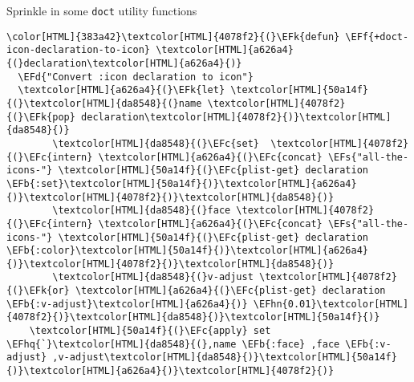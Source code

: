 \documentclass{scrartcl}
\newcommand{\EFk}[1]{\textcolor{EFk}{#1}} %
\newcommand{\EFd}[1]{\textcolor{EFd}{\textit{#1}}} %
\newcommand{\EFs}[1]{\textcolor{EFs}{#1}} %
\newcommand{\EFb}[1]{\textcolor{EFb}{#1}} %
\newcommand{\EFc}[1]{\textcolor{EFc}{#1}} %
\newcommand{\EFf}[1]{\textcolor{EFf}{#1}} %
\newcommand{\EFhn}[1]{\textcolor{EFhn}{\textbf{#1}}} %
\newcommand{\EFhq}[1]{\textcolor{EFhq}{#1}} %
\begin{document}
Sprinkle in some \texttt{doct} utility functions
\begin{Code}
\begin{Verbatim}[]
\color[HTML]{383a42}\textcolor[HTML]{4078f2}{(}\EFk{defun} \EFf{+doct-icon-declaration-to-icon} \textcolor[HTML]{a626a4}{(}declaration\textcolor[HTML]{a626a4}{)}
  \EFd{"Convert :icon declaration to icon"}
  \textcolor[HTML]{a626a4}{(}\EFk{let} \textcolor[HTML]{50a14f}{(}\textcolor[HTML]{da8548}{(}name \textcolor[HTML]{4078f2}{(}\EFk{pop} declaration\textcolor[HTML]{4078f2}{)}\textcolor[HTML]{da8548}{)}
        \textcolor[HTML]{da8548}{(}\EFc{set}  \textcolor[HTML]{4078f2}{(}\EFc{intern} \textcolor[HTML]{a626a4}{(}\EFc{concat} \EFs{"all-the-icons-"} \textcolor[HTML]{50a14f}{(}\EFc{plist-get} declaration \EFb{:set}\textcolor[HTML]{50a14f}{)}\textcolor[HTML]{a626a4}{)}\textcolor[HTML]{4078f2}{)}\textcolor[HTML]{da8548}{)}
        \textcolor[HTML]{da8548}{(}face \textcolor[HTML]{4078f2}{(}\EFc{intern} \textcolor[HTML]{a626a4}{(}\EFc{concat} \EFs{"all-the-icons-"} \textcolor[HTML]{50a14f}{(}\EFc{plist-get} declaration \EFb{:color}\textcolor[HTML]{50a14f}{)}\textcolor[HTML]{a626a4}{)}\textcolor[HTML]{4078f2}{)}\textcolor[HTML]{da8548}{)}
        \textcolor[HTML]{da8548}{(}v-adjust \textcolor[HTML]{4078f2}{(}\EFk{or} \textcolor[HTML]{a626a4}{(}\EFc{plist-get} declaration \EFb{:v-adjust}\textcolor[HTML]{a626a4}{)} \EFhn{0.01}\textcolor[HTML]{4078f2}{)}\textcolor[HTML]{da8548}{)}\textcolor[HTML]{50a14f}{)}
    \textcolor[HTML]{50a14f}{(}\EFc{apply} set \EFhq{`}\textcolor[HTML]{da8548}{(},name \EFb{:face} ,face \EFb{:v-adjust} ,v-adjust\textcolor[HTML]{da8548}{)}\textcolor[HTML]{50a14f}{)}\textcolor[HTML]{a626a4}{)}\textcolor[HTML]{4078f2}{)}


\end{Verbatim}
\end{Code}
\end{document}
